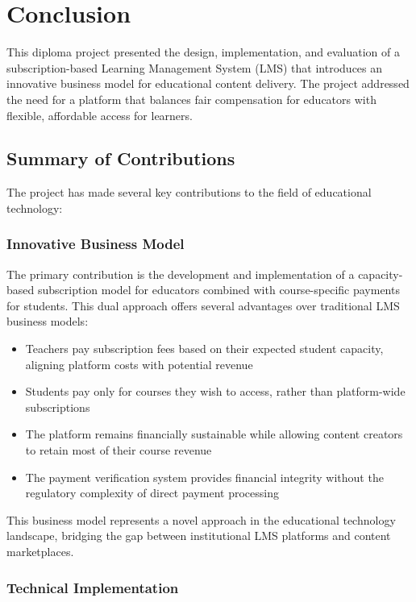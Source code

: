 \section{Conclusion}

This diploma project presented the design, implementation, and evaluation of a subscription-based Learning Management System (LMS) that introduces an innovative business model for educational content delivery. The project addressed the need for a platform that balances fair compensation for educators with flexible, affordable access for learners.

\subsection{Summary of Contributions}

The project has made several key contributions to the field of educational technology:

\subsubsection{Innovative Business Model}

The primary contribution is the development and implementation of a capacity-based subscription model for educators combined with course-specific payments for students. This dual approach offers several advantages over traditional LMS business models:

\begin{itemize}
    \item Teachers pay subscription fees based on their expected student capacity, aligning platform costs with potential revenue
    \item Students pay only for courses they wish to access, rather than platform-wide subscriptions
    \item The platform remains financially sustainable while allowing content creators to retain most of their course revenue
    \item The payment verification system provides financial integrity without the regulatory complexity of direct payment processing
\end{itemize}

This business model represents a novel approach in the educational technology landscape, bridging the gap between institutional LMS platforms and content marketplaces.

\subsubsection{Technical Implementation}

